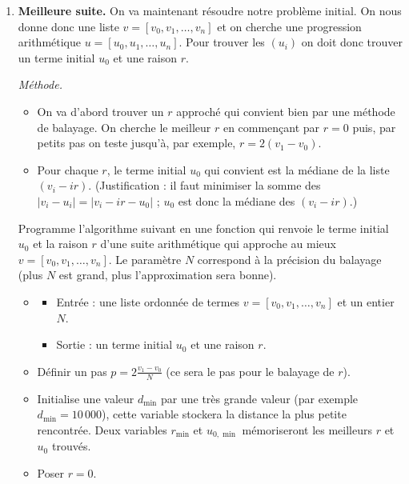 \documentclass[11pt,class=report,crop=false]{standalone}
\begin{document}
\begin{activite}
\begin{enumerate}
   
  \item \textbf{Meilleure suite.} On va maintenant résoudre notre problème initial.  On nous donne donc une liste  $v = [v_0,v_1,\ldots,v_n]$
 et on cherche une progression arithmétique $u = [u_0,u_1,\ldots,u_n]$.
 Pour trouver les $(u_i)$ on doit donc trouver un terme initial $u_0$
 et une raison $r$.
 
 \emph{Méthode.}
 \begin{itemize}
   \item On va d'abord trouver un $r$ approché qui convient bien par une méthode de balayage. On cherche le meilleur $r$ en commençant par $r=0$ puis, par petits pas on teste jusqu'à, par exemple, $r = 2(v_1-v_0)$.
   
   \item Pour chaque $r$, le terme initial $u_0$ qui convient est la médiane de 
   la liste $(v_i - ir)$. (Justification : il faut minimiser la somme des $|v_i-u_i| = |v_i - ir - u_0|$ ; $u_0$ est donc la médiane des $(v_i - ir)$.)
   
 \end{itemize}
 
 Programme l'algorithme suivant en une fonction  qui renvoie
 le terme initial $u_0$ et la raison $r$ d'une suite arithmétique qui approche au mieux $v = [v_0,v_1,\ldots,v_n]$. Le paramètre $N$ correspond à la précision du balayage (plus $N$ est grand, plus l'approximation sera bonne).
 \begin{algorithme}
  \sauteligne 
 \begin{itemize}
   \item
   \begin{itemize}
     \item Entrée : une liste ordonnée de termes $v = [v_0,v_1,\ldots,v_n]$ et un entier $N$.
     \item Sortie : un terme initial $u_0$ et une raison $r$.
   \end{itemize}

  \item Définir un pas  $p = 2\frac{v_1-v_0}{N}$ (ce sera le pas pour le balayage de $r$).
  
  \item Initialise une valeur $d_{\min}$ par une très grande valeur (par exemple
  $d_{\min} = 10\,000$), cette variable stockera la distance la plus petite rencontrée.
  Deux variables $r_{\min}$ et $u_{0,\min}$ mémoriseront les meilleurs $r$ et $u_0$ trouvés.
  
  \item Poser $r=0$.
  

\end{itemize}
\end{algorithme}
\end{enumerate}
\end{activite}
\end{document}
